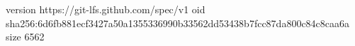 version https://git-lfs.github.com/spec/v1
oid sha256:6d6fb881ecf3427a50a1355336990b33562dd53438b7fcc87da800c84c8caa6a
size 6562
